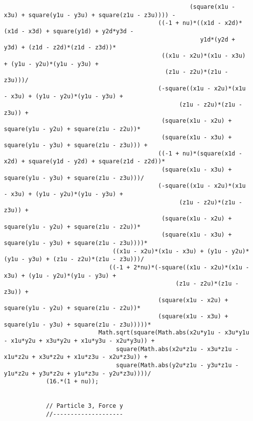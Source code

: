 \begin{lstlisting}
													 (square(x1u - x3u) + square(y1u - y3u) + square(z1u - z3u)))) - 
											((-1 + nu)*((x1d - x2d)*(x1d - x3d) + square(y1d) + y2d*y3d - 
														y1d*(y2d + y3d) + (z1d - z2d)*(z1d - z3d))*
											 ((x1u - x2u)*(x1u - x3u) + (y1u - y2u)*(y1u - y3u) + 
											  (z1u - z2u)*(z1u - z3u)))/
											(-square((x1u - x2u)*(x1u - x3u) + (y1u - y2u)*(y1u - y3u) + 
												  (z1u - z2u)*(z1u - z3u)) + 
											 (square(x1u - x2u) + square(y1u - y2u) + square(z1u - z2u))*
											 (square(x1u - x3u) + square(y1u - y3u) + square(z1u - z3u))) + 
											((-1 + nu)*(square(x1d - x2d) + square(y1d - y2d) + square(z1d - z2d))*
											 (square(x1u - x3u) + square(y1u - y3u) + square(z1u - z3u)))/
											(-square((x1u - x2u)*(x1u - x3u) + (y1u - y2u)*(y1u - y3u) + 
												  (z1u - z2u)*(z1u - z3u)) + 
											 (square(x1u - x2u) + square(y1u - y2u) + square(z1u - z2u))*
											 (square(x1u - x3u) + square(y1u - y3u) + square(z1u - z3u))))*
							   ((x1u - x2u)*(x1u - x3u) + (y1u - y2u)*(y1u - y3u) + (z1u - z2u)*(z1u - z3u)))/
							  ((-1 + 2*nu)*(-square((x1u - x2u)*(x1u - x3u) + (y1u - y2u)*(y1u - y3u) + 
												 (z1u - z2u)*(z1u - z3u)) + 
											(square(x1u - x2u) + square(y1u - y2u) + square(z1u - z2u))*
											(square(x1u - x3u) + square(y1u - y3u) + square(z1u - z3u)))))*
						   Math.sqrt(square(Math.abs(x2u*y1u - x3u*y1u - x1u*y2u + x3u*y2u + x1u*y3u - x2u*y3u)) + 
								square(Math.abs(x2u*z1u - x3u*z1u - x1u*z2u + x3u*z2u + x1u*z3u - x2u*z3u)) + 
								square(Math.abs(y2u*z1u - y3u*z1u - y1u*z2u + y3u*z2u + y1u*z3u - y2u*z3u))))/
			(16.*(1 + nu));
			
			
			// Particle 3, Force y
			//--------------------
			

\end{lstlisting}
